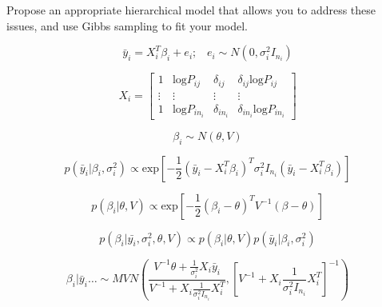 \documentclass[10pt]{article}
\begin{document}
    Propose an appropriate hierarchical model that allows you to address these issues, and use Gibbs sampling to fit your model.

    $$\bar{y}_i = X_i^T \beta_i  + e_i; \hspace{10pt} e_i \sim N(0, \sigma_i^2 I_{n_i})$$

    $$X_i = \begin{bmatrix}1 & \text{log}P_{ij} & \delta_{ij} & \delta_{ij} \text{log}P_{ij} \\
    \vdots & \vdots & \vdots & \vdots \\
    1 & \text{log}P_{in_i} & \delta_{in_i} & \delta_{in_i} \text{log}P_{in_i}
     \end{bmatrix}$$

    $$\beta_i \sim N(\theta, V)$$

    $$p(\bar{y}_i | \beta_i, \sigma_i^2) \propto \text{exp}\left[-\frac{1}{2} (\bar{y}_i - X_i^T \beta_i)^T \sigma_i^2 I_{n_i} (\bar{y}_i - X_i^T \beta_i) \right]$$

    $$p(\beta_i | \theta, V) \propto \text{exp} \left[-\frac{1}{2} (\beta_i - \theta)^T V^{-1} (\beta - \theta) \right]$$

    $$p(\beta_i | \bar{y_i}, \sigma_i^2, \theta, V) \propto  p(\beta_i | \theta, V) p(\bar{y}_i | \beta_i, \sigma_i^2) $$

    $$\beta_i | \bar{y}_i \dots \sim MVN\left(\frac{V^{-1} \theta + \frac{1}{\sigma_i^2 }X_i \bar{y}_i }{V^{-1} + X_i \frac{1}{\sigma_i^2 I_{n_i}} X_i^T}, \left[V^{-1} + X_i \frac{1}{\sigma_i^2 I_{n_i}} X_i^T \right]^{-1} \right)$$
\end{document}
